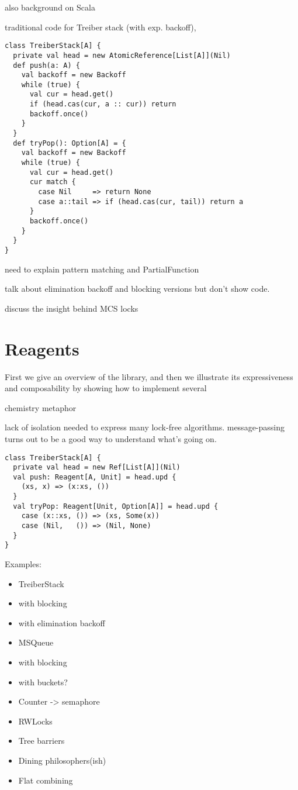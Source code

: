 \documentclass[preprint]{sigplanconf}
\begin{document}
also background on Scala

traditional code for Treiber stack (with exp. backoff), 

\begin{lstlisting}
class TreiberStack[A] {
  private val head = new AtomicReference[List[A]](Nil)
  def push(a: A) {
    val backoff = new Backoff
    while (true) {
      val cur = head.get()
      if (head.cas(cur, a :: cur)) return
      backoff.once()
    }
  }
  def tryPop(): Option[A] = {
    val backoff = new Backoff
    while (true) {
      val cur = head.get() 
      cur match {
        case Nil     => return None
        case a::tail => if (head.cas(cur, tail)) return a
      }
      backoff.once()
    }
  }
}
\end{lstlisting}

need to explain pattern matching and PartialFunction

talk about elimination backoff and blocking versions but don't show code.

discuss the insight behind MCS locks

\section{Reagents}
\label{sec:reagents}

First we give an overview of the library, and then we illustrate its
expressiveness and composability by showing how to implement several 
 
chemistry metaphor

lack of isolation needed to express many lock-free algorithms.
message-passing turns out to be a good way to understand what's going on.

\begin{lstlisting}
class TreiberStack[A] {
  private val head = new Ref[List[A]](Nil)
  val push: Reagent[A, Unit] = head.upd {
    (xs, x) => (x:xs, ())
  }
  val tryPop: Reagent[Unit, Option[A]] = head.upd {
    case (x::xs, ()) => (xs, Some(x))
    case (Nil,   ()) => (Nil, None)
  }
}
\end{lstlisting}

Examples:

\begin{itemize}
\item TreiberStack
\item with blocking
\item with elimination backoff
\item MSQueue
\item with blocking
\item with buckets?
\item Counter -> semaphore
\item RWLocks
\item Tree barriers
\item Dining philosophers(ish)
\item Flat combining
\end{itemize}
\end{document}
